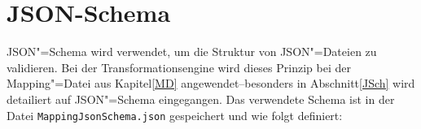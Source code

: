 
\chapter{JSON-Schema} \label{AJS}

JSON"=Schema wird verwendet, um die Struktur von JSON"=Dateien zu validieren. Bei der Transformationsengine wird dieses Prinzip bei der Mapping"=Datei aus Kapitel\nbs\ref{MD} angewendet\nbs--\nbs besonders in Abschnitt\nbs\ref{JSch} wird detailiert auf JSON"=Schema eingegangen. Das verwendete Schema ist in der Datei \texttt{MappingJsonSchema.json} gespeichert und wie folgt definiert: 
\vspace{0.7em}
